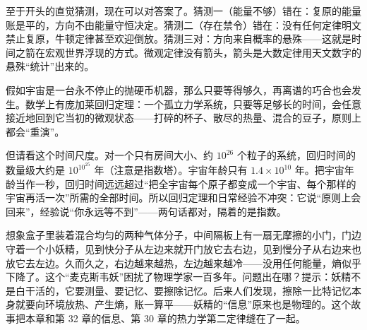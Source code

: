 至于开头的直觉猜测，现在可以对答案了。猜测一（能量不够）错在：复原的能量账是平的，方向不由能量守恒决定。猜测二（存在禁令）错在：没有任何定律明文禁止复原，牛顿定律甚至欢迎倒放。猜测三对：方向来自概率的悬殊——这就是时间之箭在宏观世界浮现的方式。微观定律没有箭头，箭头是大数定律用天文数字的悬殊“统计”出来的。


\begin{thought}[等一次全正]
假如宇宙是一台永不停止的抛硬币机器，那么只要等得够久，再离谱的巧合也会发生。数学上有庞加莱回归定理：一个孤立力学系统，只要等足够长的时间，会任意接近地回到它当初的微观状态——打碎的杯子、散尽的热量、混合的豆子，原则上都会“重演”。

但请看这个时间尺度。对一个只有房间大小、约 \(10^{26}\) 个粒子的系统，回归时间的数量级大约是 \(10^{10^{25}}\) 年（注意是指数塔）。宇宙年龄只有 \(1.4\times10^{10}\) 年。把宇宙年龄当作一秒，回归时间远远超过“把全宇宙每个原子都变成一个宇宙、每个那样的宇宙再活一次”所需的全部时间。所以回归定理和日常经验不冲突：它说“原则上会回来”，经验说“你永远等不到”——两句话都对，隔着的是指数。
\end{thought}

\begin{thought}[妖精要把守的门]
想象盒子里装着混合均匀的两种气体分子，中间隔板上有一扇无摩擦的小门，门边守着一个小妖精，见到快分子从左边来就开门放它去右边，见到慢分子从右边来也放它去左边。久而久之，右边越来越热，左边越来越冷——没用任何能量，熵似乎下降了。这个“麦克斯韦妖”困扰了物理学家一百多年。问题出在哪？提示：妖精不是白干活的，它要测量、要记忆、要擦除记忆。后来人们发现，擦除一比特记忆本身就要向环境放热、产生熵，账一算平——妖精的“信息”原来也是物理的。这个故事把本章和第 32 章的信息、第 30 章的热力学第二定律缝在了一起。
\end{thought}


